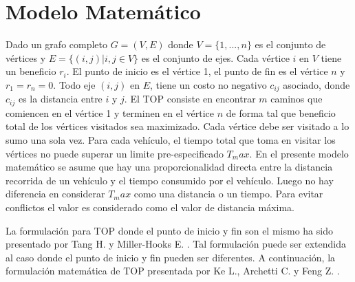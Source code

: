 \chapter{Modelo Matemático}

Dado un grafo completo $G=(V,E)$ donde $V=\{1,...,n\}$ es el conjunto de vértices y $E=\{(i,j)|i,j \in V\}$ es el conjunto de ejes. Cada vértice $i$ en $V$ tiene un beneficio $r_i$. El punto de inicio es el vértice 1, el punto de fin es el vértice $n$ y $r_1=r_n=0$. Todo eje $(i,j)$ en $E$, tiene un costo no negativo $c_{ij}$ asociado, donde $c_{ij}$ es la distancia entre $i$ y $j$. El TOP consiste en encontrar $m$ caminos que comiencen en el vértice 1 y terminen en el vértice $n$ de forma tal que beneficio total de los vértices visitados sea maximizado. Cada vértice debe ser visitado a lo sumo una sola vez. Para cada vehículo, el tiempo total que toma en visitar los vértices no puede superar un limite pre-especificado $T_max$. En el presente modelo matemático se asume que hay una proporcionalidad directa entre la distancia recorrida de un vehículo y el tiempo consumido por el vehículo. Luego no hay diferencia en considerar $T_max$ como una distancia o un tiempo. Para evitar conflictos el valor es considerado como el valor de distancia máxima.

\bigskip

La formulación para TOP donde el punto de inicio y fin son el mismo ha sido presentado por Tang H. y Miller-Hooks E. \cite{TangMillerHooks}. Tal formulación puede ser extendida al caso donde el punto de inicio y fin pueden ser diferentes. A continuación, la formulación matemática de TOP presentada por Ke L., Archetti C. y Feng Z. \cite{KeArchettiFeng}.

\bigskip

